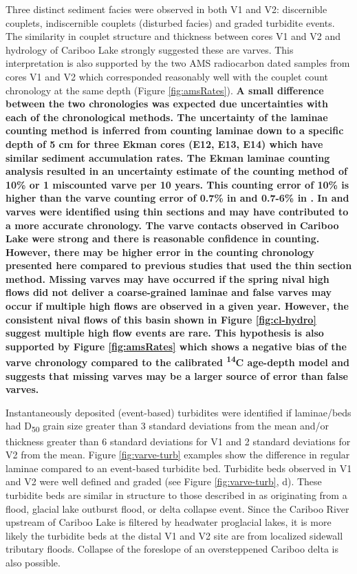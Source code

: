 \documentclass[Royal,times,doublespace,sageh]{sagej}
\begin{document}
Three distinct sediment facies were observed in both V1 and V2:
discernible couplets, indiscernible couplets (disturbed facies) and
graded turbidite events. The similarity in couplet structure and
thickness between cores V1 and V2 and hydrology of Cariboo Lake strongly
suggested these are varves. This interpretation is also supported by the
two AMS radiocarbon dated samples from cores V1 and V2 which
corresponded reasonably well with the couplet count chronology at the
same depth (Figure \ref{fig:amsRates}). \textbf{A small difference
between the two chronologies was expected due uncertainties with each of
the chronological methods. The uncertainty of the laminae counting
method is inferred from counting laminae down to a specific depth of 5
cm for three Ekman cores (E12, E13, E14) which have similar sediment
accumulation rates. The Ekman laminae counting analysis resulted in an
uncertainty estimate of the counting method of 10\% or 1 miscounted
varve per 10 years. This counting error of 10\% is higher than the varve
counting error of 0.7\% in \citet{Menounos2008c} and 0.7-6\% in
\citet{Zolitschka1991}. In \citet{Menounos2008c} and
\citet{Zolitschka1991} varves were identified using thin sections and
may have contributed to a more accurate chronology. The varve contacts
observed in Cariboo Lake were strong and there is reasonable confidence
in counting. However, there may be higher error in the counting
chronology presented here compared to previous studies that used the
thin section method. Missing varves may have occurred if the spring
nival high flows did not deliver a coarse-grained laminae and false
varves may occur if multiple high flows are observed in a given year.
However, the consistent nival flows of this basin shown in Figure
\ref{fig:cl-hydro} suggest multiple high flow events are rare. This
hypothesis is also supported by Figure \ref{fig:amsRates} which shows a
negative bias of the varve chronology compared to the calibrated
\textsuperscript{14}C age-depth model and suggests that missing varves
may be a larger source of error than false varves.}

Instantaneously deposited (event-based) turbidites were identified if
laminae/beds had D\textsubscript{50} grain size greater than 3 standard
deviations from the mean and/or thickness greater than 6 standard
deviations for V1 and 2 standard deviations for V2 from the mean. Figure
\ref{fig:varve-turb} examples show the difference in regular laminae
compared to an event-based turbidite bed. Turbidite beds observed in V1
and V2 were well defined and graded (see Figure \ref{fig:varve-turb},
d). These turbidite beds are similar in structure to those described in
\citet{sabatier2022} as originating from a flood, glacial lake outburst
flood, or delta collapse event. Since the Cariboo River upstream of
Cariboo Lake is filtered by headwater proglacial lakes, it is more
likely the turbidite beds at the distal V1 and V2 site are from
localized sidewall tributary floods. Collapse of the foreslope of an
oversteppened Cariboo delta is also possible.
\end{document}

